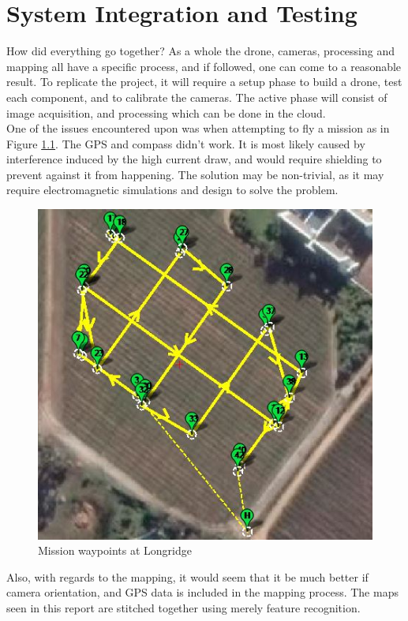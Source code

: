 \chapter{System Integration and Testing}

How did everything go together? As a whole the drone, cameras, processing and mapping all have a specific process, and if followed, one can come to a reasonable result. To replicate the project, it will require a setup phase to build a drone, test each component, and to calibrate the cameras. The active phase will consist of image acquisition, and processing which can be done in the cloud. \\

One of the issues encountered upon was when attempting to fly a mission as in Figure \ref{fig:longridge_waypoints}. The GPS and compass didn't work. It is most likely caused by interference induced by the high current draw, and would require shielding to prevent against it from happening. The solution may be non-trivial, as it may require electromagnetic simulations and design to solve the problem.

\begin{figure}[H]
\centering
\includegraphics[scale=0.4]{images/longridge_waypoints.jpg}
\caption{Mission waypoints at Longridge}
\label{fig:longridge_waypoints}
\end{figure}

Also, with regards to the mapping, it would seem that it be much better if camera orientation, and GPS data is included in the mapping process. The maps seen in this report are stitched together using merely feature recognition.\\



